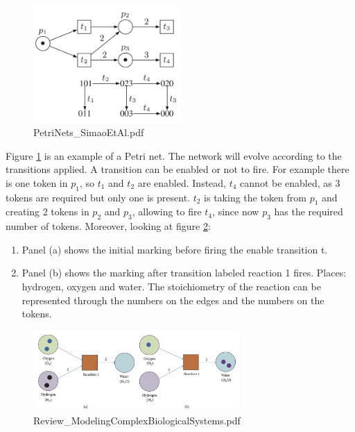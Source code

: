   \begin{figure}[H]
    \centering
    \includegraphics[width=0.5\textwidth]{petri_nets.png}
    \caption{PetriNets\_SimaoEtAl.pdf}
    \label{fig:petri}
  \end{figure}

  Figure \ref{fig:petri} is an example of a Petri net.
  The network will evolve according to the transitions applied.
  A transition can be enabled or not to fire.
  For example there is one token in \(p_1\), so \(t_1\) and \(t_2\) are enabled.
  Instead, \(t_4\) cannot be enabled, as 3 tokens are required but only one is present.
  \(t_2\) is taking the token from \(p_1\) and creating 2 tokens in \(p_2\) and \(p_3\), allowing to fire \(t_4\), since now \(p_3\) has the required number of tokens.
  Moreover, looking at figure \ref{fig:expetri}:

  \begin{multicols}{2}
    \begin{enumerate}
        \item Panel (a) shows the initial marking before firing the enable transition t.
        \item Panel (b) shows the marking after transition labeled reaction 1 fires.
          Places: hydrogen, oxygen and water.
          The stoichiometry of the reaction can be represented through the numbers on the edges and the numbers on the tokens.
    \end{enumerate}
  \end{multicols}

  \begin{figure}[H]
    \centering
    \includegraphics[width=0.7\textwidth]{example_petri.png}
    \caption{Review\_ModelingComplexBiologicalSystems.pdf}
    \label{fig:expetri}
  \end{figure}

